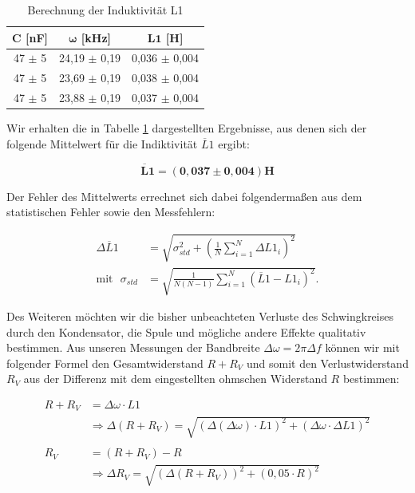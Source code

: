 \documentclass{article}
\begin{document}
\phantom{.}

\begin{table}[!h]
    \centering
    \begin{tabular}{ccc}
        \hline
        $\bm{C}$ [nF] & $\bm{\omega}$ [kHz] & $\bm{L1}$ [H]  \\ \hline
         47 $\pm$ 5 & 24,19 $\pm$ 0,19 & 0,036 $\pm$ 0,004 \\
         47 $\pm$ 5 & 23,69 $\pm$ 0,19 & 0,038 $\pm$ 0,004 \\
         47 $\pm$ 5 & 23,88 $\pm$ 0,19 & 0,037 $\pm$ 0,004 \\ \hline
    \end{tabular}%
    \caption{Berechnung der Induktivität L1}
    \label{tab:A4-L1}
\end{table}

\phantom{.}

Wir erhalten die in Tabelle \ref{tab:A4-L1} dargestellten Ergebnisse, aus denen sich der folgende Mittelwert für die Indiktivität $\overline{L}1$ ergibt:

\begin{equation}
    \bm{\overline{L}1 = (0,037 \pm 0,004)} \textbf{H}
\end{equation}

Der Fehler des Mittelwerts errechnet sich dabei folgendermaßen aus dem statistischen Fehler sowie den Messfehlern:

\begin{equation}
    \begin{split}
        \Delta \overline{L}1 &= \sqrt{\sigma_{std}^2 + \left( \frac{1}{N} \sum_{i=1}^N \Delta L1_i \right)^2} \\
        \text{mit} \ \ \ \sigma_{std} &= \sqrt{\frac{1}{N(N-1)} \sum_{i=1}^N (\overline{L}1 - L1_i)^2}.
    \end{split}
\end{equation}

Des Weiteren möchten wir die bisher unbeachteten Verluste des Schwingkreises durch den Kondensator, die Spule und mögliche andere Effekte qualitativ bestimmen. Aus unseren Messungen der Bandbreite $\Delta \omega = 2 \pi \Delta f$ können wir mit folgender Formel den Gesamtwiderstand $R + R_V$ und somit den Verlustwiderstand $R_V$ aus der Differenz mit dem eingestellten ohmschen Widerstand $R$ bestimmen:

\begin{equation}
    \begin{split}
        R+R_V &= \Delta \omega \cdot L1 \\
        &\Rightarrow \Delta (R+R_V) = \sqrt{(\Delta(\Delta \omega) \cdot L1)^2 + (\Delta \omega \cdot \Delta L1)^2} \\ \\
        R_V &= (R+R_V) - R \\
        &\Rightarrow \Delta R_V = \sqrt{(\Delta (R+R_V))^2 + (0,05 \cdot R)^2} 
    \end{split}
\end{equation}
\end{document}
